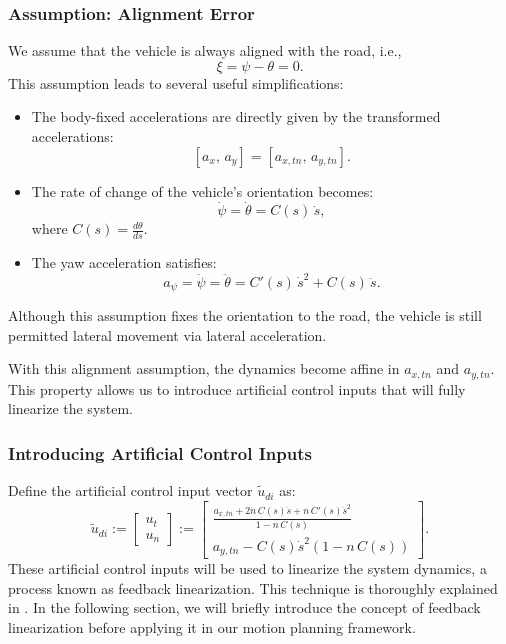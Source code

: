 \subsubsection{Assumption: Alignment Error} \label{subsubsec:alignment_error}
We assume that the vehicle is always aligned with the road, i.e.,
\begin{equation}
	\xi = \psi - \theta = 0.
\end{equation}
This assumption leads to several useful simplifications:
\begin{itemize}
	\item The body-fixed accelerations are directly given by the transformed accelerations:
	      \[
		      [a_x,\, a_y] = [a_{x,tn},\, a_{y,tn}].
	      \]
	\item The rate of change of the vehicle's orientation becomes:
	      \[
		      \dot{\psi} = \dot{\theta} = C(s)\,\dot{s},
	      \]
	      where \(C(s)=\frac{d\theta}{ds}\).
	\item The yaw acceleration satisfies:
	      \[
		      a_\psi = \ddot{\psi} = \ddot{\theta} = C'(s)\,\dot{s}^2 + C(s)\,\ddot{s}.
	      \]
\end{itemize}
Although this assumption fixes the orientation to the road, the vehicle is still permitted lateral movement via lateral acceleration.

With this alignment assumption, the dynamics become affine in \(a_{x,tn}\) and \(a_{y,tn}\).
This property allows us to introduce artificial control inputs that will fully linearize the system.

\subsubsection{Introducing Artificial Control Inputs}

Define the artificial control input vector \(\tilde{u}_{di}\) as:
\begin{equation}
	\label{eq:artificial_controls}
	\tilde{u}_{di} := \begin{bmatrix}
		u_t \\
		u_n
	\end{bmatrix} :=
	\begin{bmatrix}
		\displaystyle \frac{a_{x,tn} + 2\dot{n}\,C(s)\dot{s} + n\,C'(s)\dot{s}^2}{1 - n\,C(s)} \\
		a_{y,tn} - C(s)\dot{s}^2(1 - n\,C(s))
	\end{bmatrix}.
\end{equation}
These artificial control inputs will be used to linearize the system dynamics, a process known as feedback linearization.
This technique is thoroughly explained in \cite{khalil_nonlinear_2002}.
In the following section, we will briefly introduce the concept of feedback linearization before applying it in our motion planning framework.

